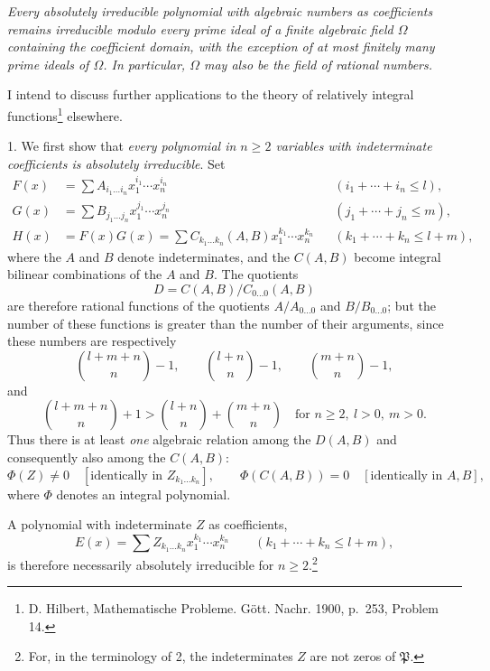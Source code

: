 \emph{Every absolutely irreducible polynomial with algebraic numbers as coefficients remains irreducible modulo every prime ideal of a finite algebraic field $\Omega$ containing the coefficient domain, with the exception of at most finitely many prime ideals of $\Omega$. In particular, $\Omega$ may also be the field of rational numbers.}

I intend to discuss further applications to the theory of relatively integral functions\footnote{D. Hilbert, Mathematische Probleme. Gött. Nachr. 1900, p.~253, Problem 14.} elsewhere.

1. We first show that \emph{every polynomial in $n\ge2$ variables with indeterminate coefficients is absolutely irreducible}. Set
\begin{equation}
\begin{aligned}
F(x)&=\sum A_{i_1\ldots i_n}x_1^{i_1}\cdots x_n^{i_n} &&(i_1+\cdots+i_n\le l),\\
G(x)&=\sum B_{j_1\ldots j_n}x_1^{j_1}\cdots x_n^{j_n} &&(j_1+\cdots+j_n\le m),\\
H(x)&=F(x)G(x)=\sum C_{k_1\ldots k_n}(A,B)x_1^{k_1}\cdots x_n^{k_n} &&(k_1+\cdots+k_n\le l+m),
\end{aligned}
\tag{1}
\end{equation}
where the $A$ and $B$ denote indeterminates, and the $C(A,B)$ become integral bilinear combinations of the $A$ and $B$. The quotients
\[
D=C(A,B)/C_{0\ldots0}(A,B)
\]
are therefore rational functions of the quotients $A/A_{0\ldots0}$ and $B/B_{0\ldots0}$; but the number of these functions is greater than the number of their arguments, since these numbers are respectively
\[
\binom{l+m+n}{n}-1,
\qquad
\binom{l+n}{n}-1,
\qquad
\binom{m+n}{n}-1,
\]
and
\[
\binom{l+m+n}{n}+1>
\binom{l+n}{n}+\binom{m+n}{n}
\quad\text{for } n\ge2,\ l>0,\ m>0.
\]
Thus there is at least \emph{one} algebraic relation among the $D(A,B)$ and consequently also among the $C(A,B)$:
\begin{equation}
 \Phi(Z)\ne0\quad[\text{identically in }Z_{k_1\ldots k_n}],
 \qquad
 \Phi(C(A,B))=0\quad[\text{identically in }A,B],
\tag{2}
\end{equation}
where $\Phi$ denotes an integral polynomial.

A polynomial with indeterminate $Z$ as coefficients,
\begin{equation}
 E(x)=\sum Z_{k_1\ldots k_n}x_1^{k_1}\cdots x_n^{k_n}
 \qquad(k_1+\cdots+k_n\le l+m),
\tag{3}
\end{equation}
is therefore necessarily absolutely irreducible for $n\ge2$.\footnote{For, in the terminology of 2, the indeterminates $Z$ are not zeros of $\mathfrak P$.}

